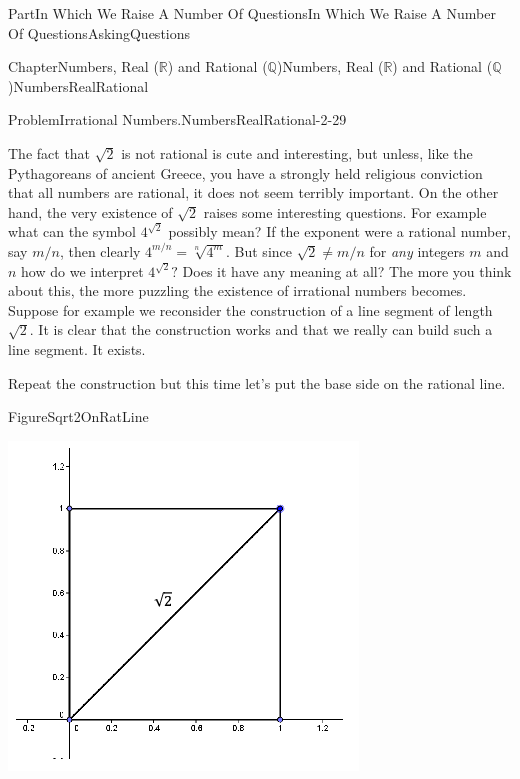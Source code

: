 \documentclass[oneside,10pt,]{book}
\numberwithin{equation}{part}
\newcommand{\RR}{\mathbb {R}}
\newcommand{\QQ}{\mathbb {Q}}
\begin{document}
\begin{partptx}{Part}{In Which We Raise A Number Of Questions}{}{In Which We Raise A Number Of Questions}{}{}{AskingQuestions}
\begin{chapterptx}{Chapter}{Numbers, Real (\(\RR\)) and Rational (\(\QQ\))}{}{Numbers, Real (\(\RR\)) and Rational (\(\QQ\))}{}{}{NumbersRealRational}
\begin{introduction}{}
\begin{problem}{Problem}{Irrational Numbers.}{NumbersRealRational-2-29}
\end{problem}
 The fact that \(\sqrt{2}\) is not rational is cute and interesting, but unless, like the Pythagoreans of ancient Greece, you have a strongly held religious conviction that all numbers are rational, it does not seem terribly important. On the other hand, the very existence of \(\sqrt{2}\) raises some interesting questions. For example what can the symbol \(4^{\sqrt{2}}\) possibly mean? If the exponent were a rational number, say \(m/n\), then clearly \(4^{m/n}=\sqrt[n]{4^m}\). But since \(\sqrt{2}\neq m/n\) for \emph{any} integers \(m\) and \(n\) how do we interpret \(4^{\sqrt{2}}?\) Does it have any meaning at all? The more you think about this, the more puzzling the existence of irrational numbers becomes. Suppose for example we reconsider the construction of a line segment of length \(\sqrt{2}\). It is clear that the construction works and that we really can build such a line segment. It exists.%
\par
Repeat the construction but this time let's put the base side on the rational line.%
\begin{figureptx}{Figure}{}{Sqrt2OnRatLine}{}%
\begin{image}{0.25}{0.5}{0.25}{}%
\includegraphics[width=\linewidth]{external/images/Sqrt2OnRatLine.png}
\end{image}%
\tcblower
\end{figureptx}%

\end{introduction}
\end{chapterptx}
\end{partptx}
\end{document}
